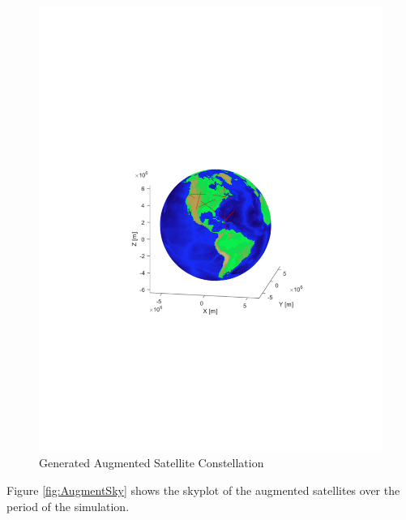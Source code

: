 \documentclass[12pt]{report}
\begin{document}
\begin{figure}[h!]
    \centering
    \includegraphics[trim=1.2in 3.3in 1.75in 3.3in,clip,width=5in]
    {Augment_Globe.pdf}
    \caption{Generated Augmented Satellite Constellation}
    \label{fig:AugmentGlobe}
\end{figure}

Figure \ref{fig:AugmentSky} shows the skyplot of the augmented satellites over the period of the simulation. 
\end{document}
